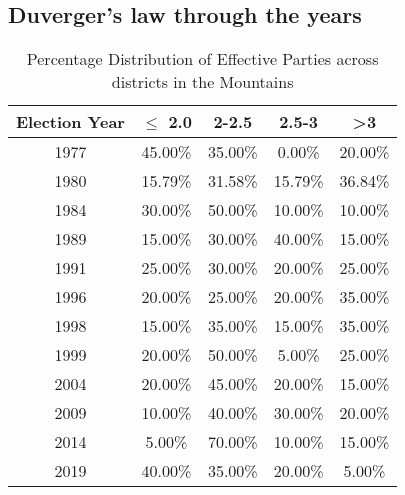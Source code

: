 \subsection{Duverger's law through the years}
\begin{table}[h]
\centering
\begin{tabular}{|c|c|c|c|c|}
\hline
Election Year & $\leq$ 2.0 & 2-2.5 & 2.5-3 & >3 \\ \hline
1977 & 45.00\% & 35.00\% & 0.00\% & 20.00\% \\ \hline
1980 & 15.79\% & 31.58\% & 15.79\% & 36.84\% \\ \hline
1984 & 30.00\% & 50.00\% & 10.00\% & 10.00\% \\ \hline
1989 & 15.00\% & 30.00\% & 40.00\% & 15.00\% \\ \hline
1991 & 25.00\% & 30.00\% & 20.00\% & 25.00\% \\ \hline
1996 & 20.00\% & 25.00\% & 20.00\% & 35.00\% \\ \hline
1998 & 15.00\% & 35.00\% & 15.00\% & 35.00\% \\ \hline
1999 & 20.00\% & 50.00\% & 5.00\% & 25.00\% \\ \hline
2004 & 20.00\% & 45.00\% & 20.00\% & 15.00\% \\ \hline
2009 & 10.00\% & 40.00\% & 30.00\% & 20.00\% \\ \hline
2014 & 5.00\% & 70.00\% & 10.00\% & 15.00\% \\ \hline
2019 & 40.00\% & 35.00\% & 20.00\% & 5.00\% \\ \hline

\end{tabular}
\caption{Percentage Distribution of Effective Parties  across districts in the Mountains}
\label{tab:mountain_percentage_district}
\end{table}

